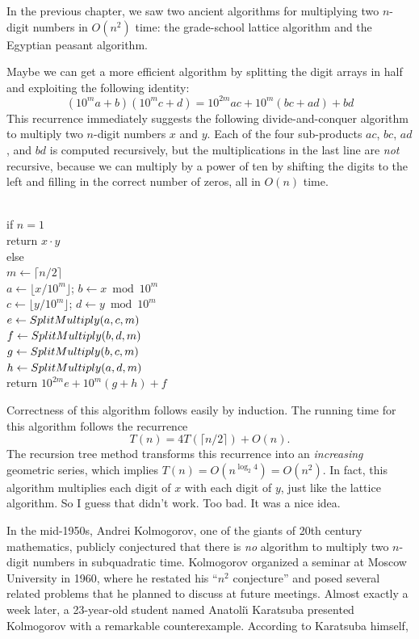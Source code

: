 In the previous chapter, we saw two ancient algorithms for multiplying two $n$-digit numbers in $O(n^2)$ time: the grade-school lattice algorithm and the Egyptian peasant algorithm.

Maybe we can get a more efficient algorithm by splitting the digit arrays in half and exploiting the following identity:
\[
(10^m a + b)(10^m c + d) = 10^{2m} ac + 10^m (bc + ad) + bd
\]
This recurrence immediately suggests the following divide-and-conquer algorithm to multiply two $n$-digit numbers $x$ and $y$. Each of the four sub-products $ac$, $bc$, $ad$, and $bd$ is computed recursively, but the multiplications in the last line are \emph{not} recursive, because we can multiply by a power of ten by shifting the digits to the left and filling in the correct number of zeros, all in $O(n)$ time.

\begin{pseudocode}
\\
if $n = 1$\\
\Indent return $x \cdot y$\\
else\\
\Indent $m \gets \lceil n/2\rceil$\\
\Indent $a \gets \lfloor x/10^m \rfloor$; $b \gets x \bmod 10^m$ \\
\Indent $c \gets \lfloor y/10^m \rfloor$; $d \gets y \bmod 10^m$ \\
\Indent $e \gets SplitMultiply(a, c, m)$\\
\Indent $f \gets SplitMultiply(b, d, m)$\\
\Indent $g \gets SplitMultiply(b, c, m)$\\
\Indent $h \gets SplitMultiply(a, d, m)$\\
\Indent return $10^{2m} e + 10^m (g + h) + f$
\end{pseudocode}

\noindent Correctness of this algorithm follows easily by induction. The running time for this algorithm follows the recurrence
\[
T(n) = 4T(\lceil n/2\rceil) + O(n).
\]
The recursion tree method transforms this recurrence into an \emph{increasing} geometric series, which implies $T(n) = O(n^{\log_2 4}) = O(n^2)$. In fact, this algorithm multiplies each digit of $x$ with each digit of $y$, just like the lattice algorithm. So I guess that didn’t work. Too bad. It was a nice idea.

In the mid-1950s, Andrei Kolmogorov, one of the giants of 20th century mathematics, publicly conjectured that there is \emph{no} algorithm to multiply two $n$-digit numbers in subquadratic time. Kolmogorov organized a seminar at Moscow University in 1960, where he restated his “$n^2$ conjecture” and posed several related problems that he planned to discuss at future meetings. Almost exactly a week later, a 23-year-old student named Anatoli\u{\i} Karatsuba presented Kolmogorov with a remarkable counterexample. According to Karatsuba himself,

